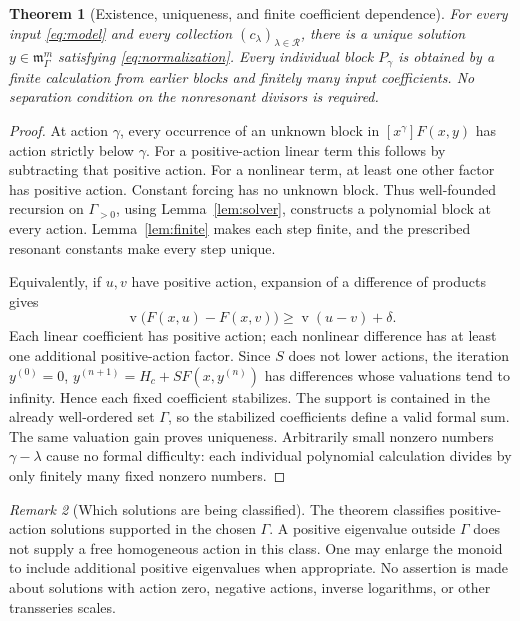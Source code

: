 \documentclass[11pt,a4paper]{article}
\numberwithin{equation}{section}
\newtheorem{theorem}{Theorem}[section]
\theoremstyle{definition}
\theoremstyle{remark}
\newtheorem{remark}[theorem]{Remark}
\newcommand{\G}{\Gamma}
\newcommand{\Reson}{\mathcal R}
\newcommand{\val}{\operatorname{v}}
\begin{document}
\begin{theorem}[Existence, uniqueness, and finite coefficient dependence]
\label{thm:formal}
For every input \eqref{eq:model} and every collection
\((c_\lambda)_{\lambda\in\Reson}\), there is a unique solution
\(y\in\mathfrak m_\G^m\) satisfying \eqref{eq:normalization}.
Every individual block \(P_\gamma\) is obtained by a finite calculation
from earlier blocks and finitely many input coefficients.
No separation condition on the nonresonant divisors is required.
\end{theorem}
\begin{proof}
At action \(\gamma\), every occurrence of an unknown block in
\([x^\gamma]F(x,y)\) has action strictly below \(\gamma\).
For a positive-action linear term this follows by subtracting that
positive action. For a nonlinear term, at least one other factor has
positive action. Constant forcing has no unknown block. Thus
well-founded recursion on \(\G_{>0}\), using
Lemma~\ref{lem:solver}, constructs a polynomial block at every action.
Lemma~\ref{lem:finite} makes each step finite, and the prescribed
resonant constants make every step unique.

Equivalently, if \(u,v\) have positive action, expansion of a difference
of products gives
\begin{equation}\label{eq:valuation-gain}
 \val\bigl(F(x,u)-F(x,v)\bigr)
      \ge\val(u-v)+\delta.
\end{equation}
Each linear coefficient has positive action; each nonlinear difference
has at least one additional positive-action factor. Since \(S\) does
not lower actions, the iteration
\(y^{(0)}=0\), \(y^{(n+1)}=H_c+SF(x,y^{(n)})\) has differences whose
valuations tend to infinity. Hence each fixed coefficient stabilizes.
The support is contained in the already well-ordered set \(\G\), so
the stabilized coefficients define a valid formal sum. The same
valuation gain proves uniqueness. Arbitrarily small nonzero numbers
\(\gamma-\lambda\) cause no formal difficulty: each individual
polynomial calculation divides by only finitely many fixed nonzero
numbers.
\end{proof}

\begin{remark}[Which solutions are being classified]
The theorem classifies positive-action solutions supported in the chosen
\(\G\). A positive eigenvalue outside \(\G\) does not supply a free
homogeneous action in this class. One may enlarge the monoid to include
additional positive eigenvalues when appropriate. No assertion is made
about solutions with action zero, negative actions, inverse logarithms,
or other transseries scales.
\end{remark}
\end{document}
